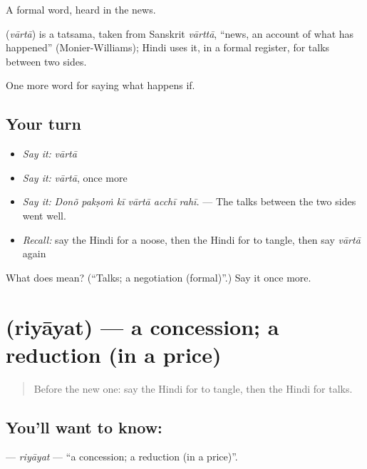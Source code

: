 A formal word, heard in the news.

\begin{cousinweb}
\textbf{} (\emph{vārtā}) is a tatsama, taken from Sanskrit \emph{vārttā}, \textquotedblleft{}news, an account of what has happened\textquotedblright{} (Monier-Williams); Hindi uses it, in a formal register, for talks between two sides.
\end{cousinweb}

\begin{grammarlens}[title={What you've built}]
One more word for saying what happens if.
\end{grammarlens}

\subsection*{Your turn}
\begin{itemize}
\raggedright
  \item \emph{Say it:} \emph{vārtā}
  \item \emph{Say it:} \emph{vārtā}, once more
  \item \emph{Say it:} \emph{Donõ pakṣoṁ kī vārtā acchī rahī.} — The talks between the two sides went well.
  \item \emph{Recall:} say the Hindi for a noose, then the Hindi for to tangle, then say \emph{vārtā} again
\end{itemize}

\begin{tcolorbox}[breakable,colback=teal!4,colframe=teal!35!black,title={Before you move on}]
What does  mean? (\textquotedblleft{}Talks; a negotiation (formal)\textquotedblright{}.) Say it once more.
\end{tcolorbox}
\section[\texorpdfstring{\hi{रियायत} (riyāyat)}{रियायत (riyāyat)}]{ (riyāyat) — a concession; a reduction (in a price)}

\label{lesson:HI-C542-riyayat}



\begin{quote}
Before the new one: say the Hindi for to tangle, then the Hindi for talks.
\end{quote}

\subsection*{You'll want to know: }
\textbf{} — \emph{riyāyat} — \textquotedblleft{}a concession; a reduction (in a price)\textquotedblright{}.

